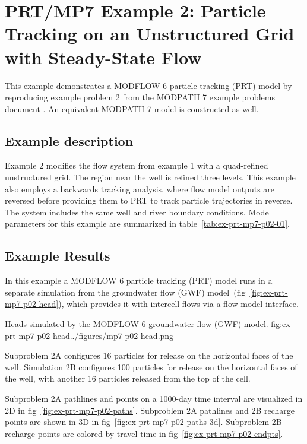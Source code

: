 \section{PRT/MP7 Example 2: Particle Tracking on an Unstructured Grid with Steady-State Flow}

This example demonstrates a MODFLOW 6 particle tracking (PRT) model by reproducing example problem 2 from the MODPATH 7 \citep{pollock2016modpath7} example problems document \citep{modpath7examples}. An equivalent MODPATH 7 model is constructed as well.

\subsection{Example description}

Example 2 modifies the flow system from example 1 with a quad-refined unstructured grid. The region near the well is refined three levels. This example also employs a backwards tracking analysis, where flow model outputs are reversed before providing them to PRT to track particle trajectories in reverse. The system includes the same well and river boundary conditions. Model parameters for this example are summarized in table~\ref{tab:ex-prt-mp7-p02-01}.



\subsection{Example Results}

In this example a MODFLOW 6 particle tracking (PRT) model runs in a separate simulation from the groundwater flow (GWF) model~(fig~\ref{fig:ex-prt-mp7-p02-head}), which provides it with intercell flows via a flow model interface.

\begin{StandardFigure}{
    Heads simulated by the MODFLOW 6 groundwater flow (GWF) model.
    }{fig:ex-prt-mp7-p02-head}{../figures/mp7-p02-head.png}
\end{StandardFigure}

Subproblem 2A configures 16 particles for release on the horizontal faces of the well. Simulation 2B configures 100 particles for release on the horizontal faces of the well, with another 16 particles released from the top of the cell.

Subproblem 2A pathlines and points on a 1000-day time interval are visualized in 2D in fig~\ref{fig:ex-prt-mp7-p02-paths}. Subproblem 2A pathlines and 2B recharge points are shown in 3D in fig~\ref{fig:ex-prt-mp7-p02-paths-3d}. Subproblem 2B recharge points are colored by travel time in fig~\ref{fig:ex-prt-mp7-p02-endpts}.

